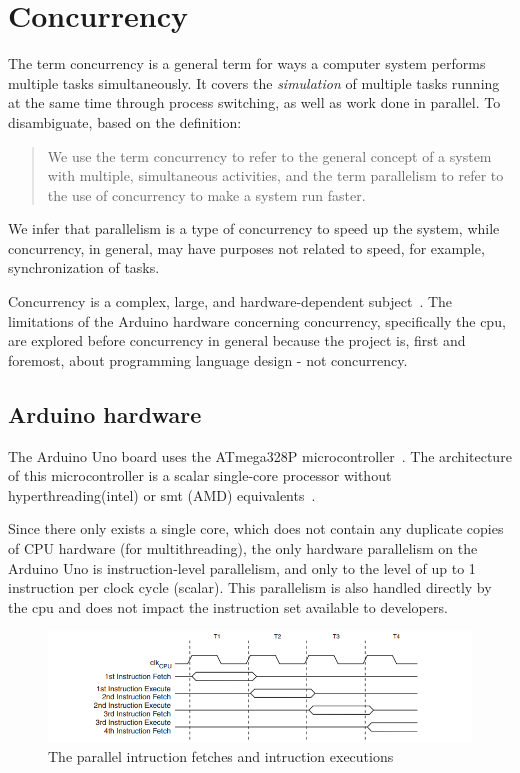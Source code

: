\section{Concurrency}\label{sec:concurrency}
The term concurrency is a general term for ways a computer system performs multiple tasks simultaneously. It covers the \textit{simulation} of multiple tasks running at the same time through process switching, as well as work done in parallel. To disambiguate, based on the definition:

\blockcquote{Bryant2016}{We use the term concurrency to refer to the general concept of a system with multiple, simultaneous activities, and the term parallelism to refer to the use of concurrency to make a system run faster.}

We infer that parallelism is a type of concurrency to speed up the system, while concurrency, in general, may have purposes not related to speed, for example, synchronization of tasks.

Concurrency is a complex, large, and hardware-dependent subject~\cite{Sebesta2016}. The limitations of the Arduino hardware concerning concurrency, specifically the \gls{cpu}, are explored before concurrency in general because the project is, first and foremost, about programming language design - not concurrency.

\subsection{Arduino hardware}\label{subsec:arduinohardware}
The Arduino Uno board uses the ATmega328P microcontroller~\cite{ArduinoUno}. The architecture of this microcontroller is a scalar single-core processor without hyperthreading(intel) or \gls{smt} (AMD) equivalents~\cite{ATmega328P}.

Since there only exists a single core, which does not contain any duplicate copies of CPU hardware (for multithreading), the only hardware parallelism on the Arduino Uno is instruction-level parallelism, and only to the level of up to 1 instruction per clock cycle (scalar). This parallelism is also handled directly by the \gls{cpu} and does not impact the instruction set available to developers.


\begin{figure}[htb!]
    \centering
    \includegraphics[width=\textwidth]{figures/Arduino_Pipeline.png}
    \caption{The parallel intruction fetches and intruction executions \cite{ATmega328P}}
    \label{fig:arduinopipeline}
\end{figure}


